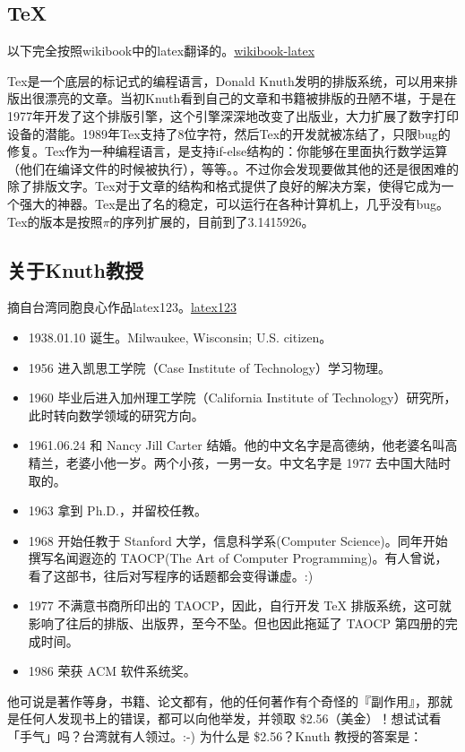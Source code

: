 \documentclass[11pt,oneside]{book}
\begin{document}
\begin{common-format}
\subsection{TeX}
以下完全按照wikibook中的latex翻译的。\href{http://en.wikibooks.org/wiki/LaTeX/Introduction}{wikibook-latex}

Tex是一个底层的标记式的编程语言，Donald Knuth发明的排版系统，可以用来排版出很漂亮的文章。当初Knuth看到自己的文章和书籍被排版的丑陋不堪，于是在1977年开发了这个排版引擎，这个引擎深深地改变了出版业，大力扩展了数字打印设备的潜能。1989年Tex支持了8位字符，然后Tex的开发就被冻结了，只限bug的修复。Tex作为一种编程语言，是支持if-else结构的：你能够在里面执行数学运算（他们在编译文件的时候被执行），等等。。不过你会发现要做其他的还是很困难的除了排版文字。Tex对于文章的结构和格式提供了良好的解决方案，使得它成为一个强大的神器。Tex是出了名的稳定，可以运行在各种计算机上，几乎没有bug。Tex的版本是按照$\pi$的序列扩展的，目前到了3.1415926。

\subsection{关于Knuth教授}
摘自台湾同胞良心作品latex123。\href{http://cle.linux.org.tw/~edt1023/tex/latex123/node2.html}{latex123}
\begin{itemize}
\item 1938.01.10	诞生。Milwaukee, Wisconsin; U.S. citizen。
\item 1956	进入凯思工学院（Case Institute of Technology）学习物理。
\item 1960	毕业后进入加州理工学院（California Institute of Technology）研究所，此时转向数学领域的研究方向。
\item 1961.06.24	和 Nancy Jill Carter 结婚。他的中文名字是高德纳，他老婆名叫高精兰，老婆小他一岁。两个小孩，一男一女。中文名字是 1977 去中国大陆时取的。
\item 1963	拿到 Ph.D.，并留校任教。
\item 1968	开始任教于 Stanford 大学，信息科学系(Computer Science)。同年开始撰写名闻遐迩的 TAOCP(The Art of Computer Programming)。有人曾说，看了这部书，往后对写程序的话题都会变得谦虚。:)
\item 1977	不满意书商所印出的 TAOCP，因此，自行开发 TeX 排版系统，这可就影响了往后的排版、出版界，至今不坠。但也因此拖延了 TAOCP 第四册的完成时间。
\item 1986	荣获 ACM 软件系统奖。
\end{itemize}
他可说是著作等身，书籍、论文都有，他的任何著作有个奇怪的『副作用』，那就是任何人发现书上的错误，都可以向他举发，并领取 \$2.56（美金）！想试试看「手气」吗？台湾就有人领过。:-) 为什么是 \$2.56？Knuth 教授的答案是：


\end{common-format}
\end{document}
